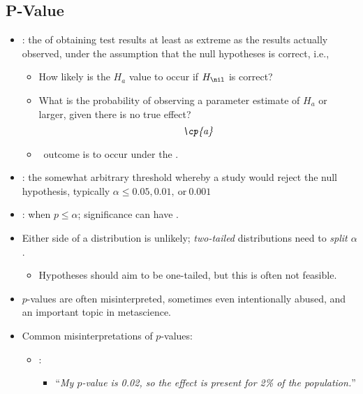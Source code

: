 \begin{itemize}
  \subsection{P-Value}
  \begin{itemize}
    \item {}: the \hyperref[Section: Probability Fundamentals]{} of obtaining test results at least as extreme as the results actually observed, under the assumption that the null hypotheses is correct, i.e.,
      \begin{itemize}
        \item How likely is the \(H_a\) value to occur if \(H_\nil\) is correct?
        \item What is the probability of observing a parameter estimate of \(H_a\) or larger, given there is no true effect?
        \[%
        \emph{\cp{a}}
        \]%
        \item {} \to~outcome is  to occur under the .
      \end{itemize}
    \item {}: the somewhat arbitrary threshold whereby a study would reject the null hypothesis, typically \(\alpha \leq 0.05, 0.01,~\text{or}~0.001\)
    \item {}: when \(p \leq \alpha\); significance can have \hyperref[Subsection: Interpretations of Significance]{}.
    \item Either side of a distribution is unlikely; \emph{two-tailed} distributions need to \emph{split \(\alpha\)}.
      \begin{itemize}
        \item Hypotheses should aim to be one-tailed, but this is often not feasible.
      \end{itemize}
    \item \(p\)-values are often misinterpreted, sometimes even intentionally abused, and an important topic in metascience.
    \item Common misinterpretations of \(p\)-values:
      \begin{itemize}
        \item {}: 
          \begin{itemize}
            \item ``\textit{My \(p\)-value is 0.02, so the effect is present for 2\% of the population.}''

\end{itemize}
\end{itemize}
\end{itemize}
\end{itemize}

